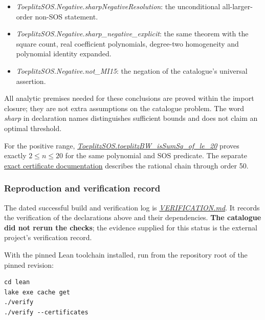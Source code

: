 \documentclass[11pt,a4paper]{article}
\providecommand{\tightlist}{\setlength{\itemsep}{0pt}\setlength{\parskip}{0pt}}
\begin{document}
\begin{itemize}
\tightlist
\item
  \textit{ToeplitzSOS.Negative.sharpNegativeResolution}: the
  unconditional all-larger-order non-SOS statement.
\item
  \textit{ToeplitzSOS.Negative.sharp\_negative\_explicit}: the same
  theorem with the square count, real coefficient polynomials,
  degree-two homogeneity and polynomial identity expanded.
\item
  \textit{ToeplitzSOS.Negative.not\_MI15}: the negation of the
  catalogue's universal assertion.
\end{itemize}

All analytic premises needed for these conclusions are proved within the
import closure; they are not extra assumptions on the catalogue problem.
The word \textit{sharp} in declaration names distinguishes sufficient
bounds and does not claim an optimal threshold.

For the positive range,
\href{https://github.com/erenup/toeplitz-bw-not-sos/blob/7126c0841b008dc89a21edfd008bbf1b748d280f/lean/ToeplitzSOS/Certificates/Range.lean}{\textit{ToeplitzSOS.toeplitzBW\_isSumSq\_of\_le\_20}}
proves exactly \(2\le n\le20\) for the same polynomial and SOS
predicate. The separate
\href{https://github.com/erenup/toeplitz-bw-not-sos/blob/7126c0841b008dc89a21edfd008bbf1b748d280f/verification/README.md\#positive-orders}{exact
certificate documentation} describes the rational chain through order
50.

\subsubsection{Reproduction and verification
record}\label{reproduction-and-verification-record}

The dated successful build and verification log is
\href{https://github.com/erenup/toeplitz-bw-not-sos/blob/7126c0841b008dc89a21edfd008bbf1b748d280f/VERIFICATION.md}{\textit{VERIFICATION.md}}.
It records the verification of the declarations above and their
dependencies. \textbf{The catalogue did not rerun the checks}; the
evidence supplied for this status is the external project's verification
record.

With the pinned Lean toolchain installed, run from the repository root
of the pinned revision:

\begin{verbatim}
cd lean
lake exe cache get
./verify
./verify --certificates
\end{verbatim}
\end{document}
